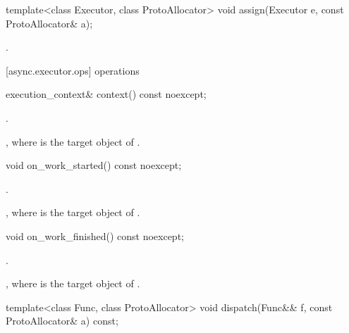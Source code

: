 %
\begin{itemdecl}
template<class Executor, class ProtoAllocator>
  void assign(Executor e, const ProtoAllocator& a);
\end{itemdecl}

\begin{itemdescr}
\pnum
\effects {}.
\end{itemdescr}



[async.executor.ops]{ operations}

%
\begin{itemdecl}
execution_context& context() const noexcept;
\end{itemdecl}

\begin{itemdescr}
\pnum
\requires {}.

\pnum
\returns {}, where  is the target object of .
\end{itemdescr}

%
\begin{itemdecl}
void on_work_started() const noexcept;
\end{itemdecl}

\begin{itemdescr}
\pnum
\requires {}.

\pnum
\effects {}, where  is the target object of .
\end{itemdescr}

%
\begin{itemdecl}
void on_work_finished() const noexcept;
\end{itemdecl}

\begin{itemdescr}
\pnum
\requires {}.

\pnum
\effects {}, where  is the target object of .
\end{itemdescr}

%
\begin{itemdecl}
template<class Func, class ProtoAllocator>
  void dispatch(Func&& f, const ProtoAllocator& a) const;
\end{itemdecl}

